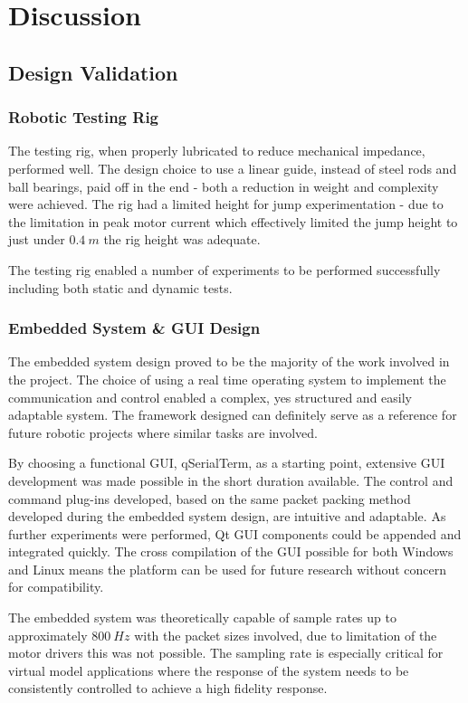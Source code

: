 \chapter{Discussion}
\section{Design Validation}

\subsection{Robotic Testing Rig}

The testing rig, when properly lubricated to reduce mechanical impedance, performed well. The design choice to use a linear guide, instead of steel rods and ball bearings, paid off in the end - both a reduction in weight and complexity were achieved. The rig had a limited height for jump experimentation - due to the limitation in peak motor current which effectively limited the jump height to just under $0.4\ m$ the rig height was adequate. 

The testing rig enabled a number of experiments to be performed successfully including both static and dynamic tests.

\subsection{Embedded System \& GUI Design}

The embedded system design proved to be the majority of the work involved in the project. The choice of using a real time operating system to implement the communication and control enabled a complex, yes structured and easily adaptable system. The framework designed can definitely serve as a reference for future robotic projects where similar tasks are involved. 

By choosing a functional GUI, qSerialTerm, as a starting point, extensive GUI development was made possible in the short duration available. The control and command plug-ins developed, based on the same packet packing method developed during the embedded system design, are intuitive and adaptable. As further experiments were performed, Qt GUI components could be appended and integrated quickly. The cross compilation of the GUI possible for both Windows and Linux means the platform can be used for future research without concern for compatibility.

The embedded system was theoretically capable of sample rates up to approximately $800\ Hz$ with the packet sizes involved, due to limitation of the motor drivers this was not possible. The sampling rate is especially critical for virtual model applications where the response of the system needs to be consistently controlled to achieve a high fidelity response.

